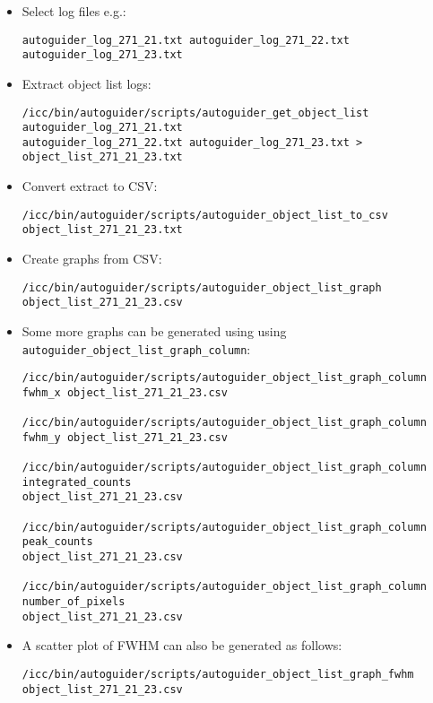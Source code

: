 \documentclass[10pt,a4paper]{article}
\begin{document}
\begin{itemize}

\item Select log files e.g.: 

\begin{verbatim}
autoguider_log_271_21.txt autoguider_log_271_22.txt autoguider_log_271_23.txt
\end{verbatim}

\item Extract object list logs:

\begin{verbatim}
/icc/bin/autoguider/scripts/autoguider_get_object_list autoguider_log_271_21.txt 
autoguider_log_271_22.txt autoguider_log_271_23.txt > object_list_271_21_23.txt
\end{verbatim}

\item Convert extract to CSV:

\begin{verbatim}
/icc/bin/autoguider/scripts/autoguider_object_list_to_csv object_list_271_21_23.txt
\end{verbatim}

\item Create graphs from CSV:

\begin{verbatim}
/icc/bin/autoguider/scripts/autoguider_object_list_graph object_list_271_21_23.csv
\end{verbatim}

\item Some more graphs can be generated using using \verb'autoguider_object_list_graph_column':

\begin{verbatim}
/icc/bin/autoguider/scripts/autoguider_object_list_graph_column fwhm_x object_list_271_21_23.csv

/icc/bin/autoguider/scripts/autoguider_object_list_graph_column fwhm_y object_list_271_21_23.csv

/icc/bin/autoguider/scripts/autoguider_object_list_graph_column integrated_counts 
object_list_271_21_23.csv

/icc/bin/autoguider/scripts/autoguider_object_list_graph_column peak_counts 
object_list_271_21_23.csv

/icc/bin/autoguider/scripts/autoguider_object_list_graph_column number_of_pixels 
object_list_271_21_23.csv
\end{verbatim}

\item A scatter plot of FWHM can also be generated as follows:

\begin{verbatim}
/icc/bin/autoguider/scripts/autoguider_object_list_graph_fwhm object_list_271_21_23.csv
\end{verbatim}

\end{itemize}
\end{document}
